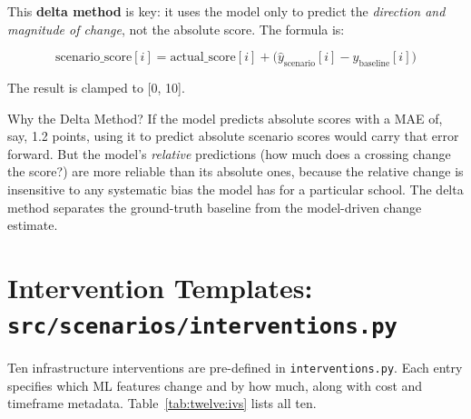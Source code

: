 \documentclass[11pt,a4paper,openany]{book}
\begin{document}
This \textbf{delta method} is key: it uses the model only to predict the \emph{direction and magnitude of change}, not the absolute score. The formula is:

\[
\text{scenario\_score}[i] = \text{actual\_score}[i]
  + \bigl(\hat{y}_{\text{scenario}}[i] - \hat{y}_{\text{baseline}}[i]\bigr)
\]

The result is clamped to [0, 10].

\begin{keybox}{Why the Delta Method?}
If the model predicts absolute scores with a MAE of, say, 1.2 points, using it to predict absolute scenario scores would carry that error forward. But the model's \emph{relative} predictions (how much does a crossing change the score?) are more reliable than its absolute ones, because the relative change is insensitive to any systematic bias the model has for a particular school. The delta method separates the ground-truth baseline from the model-driven change estimate.
\end{keybox}

\section{Intervention Templates: \texttt{src/scenarios/interventions.py}}

Ten infrastructure interventions are pre-defined in \texttt{interventions.py}. Each entry specifies which ML features change and by how much, along with cost and timeframe metadata. Table~\ref{tab:twelve:ivs} lists all ten.
\end{document}
